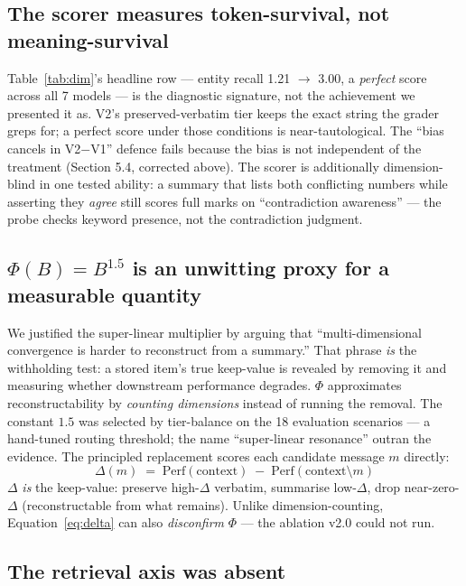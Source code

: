\documentclass[11pt,a4paper]{article}
\begin{document}
\subsection{The scorer measures token-survival, not meaning-survival}

Table~\ref{tab:dim}'s headline row --- entity recall 1.21 $\to$ 3.00, a \emph{perfect} score across all 7 models --- is the diagnostic signature, not the achievement we presented it as. V2's preserved-verbatim tier keeps the exact string the grader greps for; a perfect score under those conditions is near-tautological. The ``bias cancels in V2$-$V1'' defence fails because the bias is not independent of the treatment (Section 5.4, corrected above). The scorer is additionally dimension-blind in one tested ability: a summary that lists both conflicting numbers while asserting they \emph{agree} still scores full marks on ``contradiction awareness'' --- the probe checks keyword presence, not the contradiction judgment.

\subsection{$\Phi(B) = B^{1.5}$ is an unwitting proxy for a measurable quantity}

We justified the super-linear multiplier by arguing that ``multi-dimensional convergence is harder to reconstruct from a summary.'' That phrase \emph{is} the withholding test: a stored item's true keep-value is revealed by removing it and measuring whether downstream performance degrades. $\Phi$ approximates reconstructability by \emph{counting dimensions} instead of running the removal. The constant $1.5$ was selected by tier-balance on the 18 evaluation scenarios --- a hand-tuned routing threshold; the name ``super-linear resonance'' outran the evidence. The principled replacement scores each candidate message $m$ directly:
\begin{equation}
\Delta(m) \;=\; \mathrm{Perf}(\text{context}) \;-\; \mathrm{Perf}(\text{context} \setminus m)
\label{eq:delta}
\end{equation}
$\Delta$ \emph{is} the keep-value: preserve high-$\Delta$ verbatim, summarise low-$\Delta$, drop near-zero-$\Delta$ (reconstructable from what remains). Unlike dimension-counting, Equation~\ref{eq:delta} can also \emph{disconfirm} $\Phi$ --- the ablation v2.0 could not run.

\subsection{The retrieval axis was absent}
\end{document}
